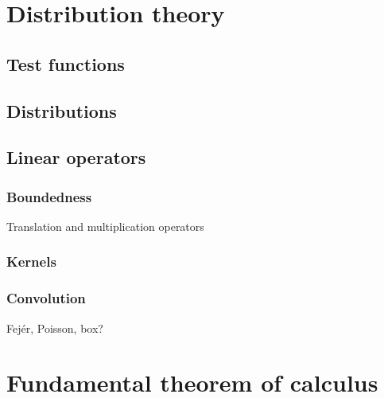 \documentclass{../../large}
\begin{document}
\part{Distribution theory}
\chapter{Test functions}


\chapter{Distributions}


\chapter{Linear operators}

\section{Boundedness}

Translation and multiplication operators

\begin{prb}
\end{prb}


\section{Kernels}
\begin{prb}
\end{prb}
\begin{prb}
\end{prb}

\section{Convolution}
\begin{prb}
Fej\'er, Poisson, box?
\end{prb}
\begin{prb}
\end{prb}











\part{Fundamental theorem of calculus}
\end{document}
